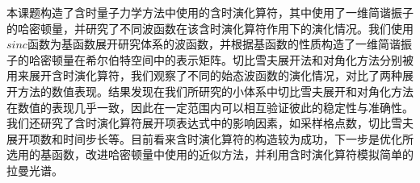 
本课题构造了含时量子力学方法中使用的含时演化算符，其中使用了一维简谐振子的哈密顿量，并研究了不同波函数在该含时演化算符作用下的演化情况。我们使用$sinc$函数为基函数展开研究体系的波函数，并根据基函数的性质构造了一维简谐振子的哈密顿量在希尔伯特空间中的表示矩阵。切比雪夫展开法和对角化方法分别被用来展开含时演化算符，我们观察了不同的始态波函数的演化情况，对比了两种展开方法的数值表现。结果发现在我们所研究的小体系中切比雪夫展开和对角化方法在数值的表现几乎一致，因此在一定范围内可以相互验证彼此的稳定性与准确性。我们还研究了含时演化算符展开项表达式中的影响因素，如采样格点数，切比雪夫展开项数和时间步长等。目前看来含时演化算符的构造较为成功，下一步是优化所选用的基函数，改进哈密顿量中使用的近似方法，并利用含时演化算符模拟简单的拉曼光谱。